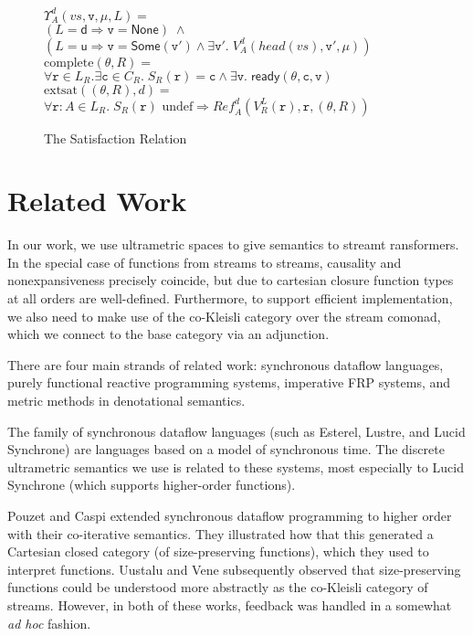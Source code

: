 \documentclass[preprint]{sigplanconf}
\newcommand{\ready}[3]{\mathsf{ready}({#1}, {#2}, {#3})}
\renewcommand{\implies}{\Rightarrow}
\newcommand{\term}[1]{\ensuremath{\mathtt{{#1}}}}
\newcommand{\Ref}{\mathit{Ref}}
\newcommand{\None}{\mathsf{None}}
\newcommand{\Some}[1]{\mathsf{Some}({#1})}
\newcommand{\U}{\mathsf{u}}
\newcommand{\D}{\mathsf{d}}
\newcommand{\head}[1]{\mathit{head}(#1)}
\newcommand{\satisfyext}[2]{\mathrm{extsat}({#1}, {#2})}
\newcommand{\complete}[1]{\mathrm{complete}(#1)}
\begin{document}
\begin{figure}
\begin{tabbing}
$\Upsilon^d_A(vs, \term{v}, \mu, L) = $ \\
\> $(L = \D \implies \term{v = \None}) \;\land$ \\
\> $(L = \U \implies \term{v}=\Some{\term{v'}} \land \exists \term{v'}.\;V^{d}_A(\head{vs}, \term{v'}, \mu))$
\\[1em]

$\complete{\theta,R} = $ \\
\> $\forall \term{r} \in L_R. \exists \term{c} \in C_R.\; S_R(\term{r}) = \term{c} \land \exists \term{v}.\;\ready{\theta}{\term{c}}{\term{v}}$ 
\\[1em]

$\satisfyext{(\theta,R)}{d} = $ \\
\> $\forall \term{r}:A \in L_R.\; S_R(\term{r}) \mbox{ undef} \implies \Ref^d_A(V^L_R(\term{r}), \term{r}, (\theta,R))$
\end{tabbing}
\caption{The Satisfaction Relation}
\label{satisfaction-relation}
\end{figure}





\section{Related Work}

In our work, we use ultrametric spaces to give semantics to streamt
ransformers. In the special case of functions from streams to
streams, causality and nonexpansiveness precisely coincide, but due to
cartesian closure function types at all orders are well-defined.
Furthermore, to support efficient implementation, we also need to make
use of the co-Kleisli category over the stream comonad, which we 
connect to the base category via an adjunction. 

There are four main strands of related work: synchronous dataflow
languages, purely functional reactive programming systems, imperative
FRP systems, and metric methods in denotational semantics.

The family of synchronous dataflow languages (such as Esterel, Lustre,
and Lucid Synchrone) are languages based on a model of synchronous
time. The discrete ultrametric semantics we use is related to these
systems, most especially to Lucid Synchrone (which supports
higher-order functions).

Pouzet and Caspi extended synchronous dataflow programming to higher
order with their co-iterative semantics. They illustrated how that
this generated a Cartesian closed category (of size-preserving
functions), which they used to interpret functions. Uustalu and Vene
subsequently observed that size-preserving functions could be
understood more abstractly as the co-Kleisli category of
streams. However, in both of these works, feedback was handled in a
somewhat \emph{ad hoc} fashion.
\end{document}
